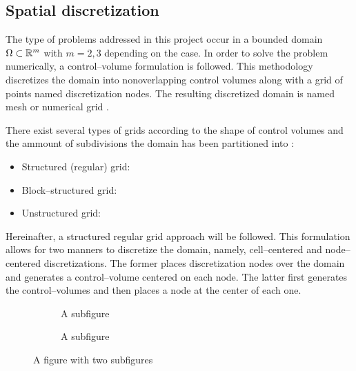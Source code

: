 
\subsection{Spatial discretization}

The type of problems addressed in this project occur in a bounded domain $\Omega \subset \mathbb{R}^m$ with $m = 2, 3$ depending on the case. In order to solve the problem numerically, a control--volume formulation is followed. This methodology discretizes the domain into nonoverlapping control volumes along with a grid of points named discretization nodes. The resulting discretized domain is named mesh or numerical grid \cite{patankar2008numerical}.

There exist several types of grids according to the shape of control volumes and the ammount of subdivisions the domain has been partitioned into \cite{ferziger2002computational2grid}:
\begin{itemize}
	\item Structured (regular) grid: 
	\item Block--structured grid:
	\item Unstructured grid:
\end{itemize}

Hereinafter, a structured regular grid approach will be followed. This formulation allows for two manners to discretize the domain, namely, cell--centered and node--centered discretizations. The former places discretization nodes over the domain and generates a control--volume centered on each node. The latter first generates the control--volumes and then places a node at the center of each one.

\begin{figure}[h]
	\centering
	\begin{subfigure}{.5\textwidth}
		\centering
		\caption{A subfigure}
		\label{fig:sub1}
	\end{subfigure}%
	\begin{subfigure}{.5\textwidth}
		\centering
		\caption{A subfigure}
		\label{fig:sub2}
	\end{subfigure}
	\caption{A figure with two subfigures}
	\label{fig:face_node_centered_discretization_comparison}
\end{figure}